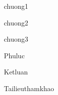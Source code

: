 \documentclass[12pt, a4paper, reqno, oneside]{book}
\theoremstyle{remark}
\begin{document}
\makeatletter
\renewcommand{\ps@myheadings}{
\renewcommand{\@oddhead}{\textsf{Luận văn Thạc sỹ - ngành toán ứng dụng}\hfil\textrm{\thepage}}
\renewcommand{\@oddfoot}{\textsf{Nghiêm Minh Hoàng, CA160035, Toán ứng dụng.}\hfil}
}
\makeatother 

\newpage


\pagestyle{plain}


\tableofcontents
\newpage


\newpage
 {chuong1}

\newpage
 {chuong2}

\newpage
 {chuong3}

\newpage
 {Phuluc}

 {Ketluan}

\newpage
 {Tailieuthamkhao}
\end{document}
